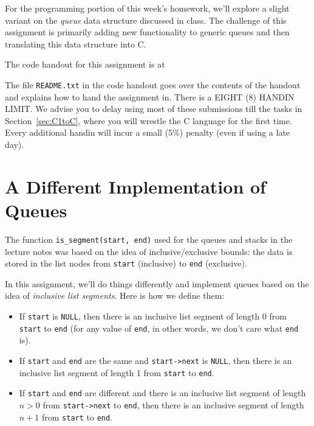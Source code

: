 \documentclass[12pt]{exam}
\begin{document}
\hwTitle

\noindent
For the programming portion of this week's homework, we'll explore a
slight variant on the \emph{queue} data structure discussed in
class. The challenge of this assignment is primarily adding new functionality
to generic queues and then translating this data structure into C.

\bigskip
\noindent
The code handout for this assignment is at
\begin{center}
\end{center}
The file \lstinline'README.txt' in the code handout goes over the
contents of the handout and explains how to hand the assignment in.
There is a EIGHT (8) HANDIN LIMIT.  We advise you to delay using most
of these submissions till the tasks in Section~\ref{sec:C1toC}, where
you will wrestle the C language for the first time.  Every additional
handin will incur a small (5\%) penalty (even if using a late day).


\section{A Different Implementation of Queues}

The function \lstinline'is_segment(start, end)' used for the queues
and stacks in the lecture notes was based on the idea of
inclusive/exclusive bounds: the data is stored in the list nodes from
\lstinline'start' (inclusive) to \lstinline'end' (exclusive).

In this assignment, we'll do things differently and implement queues
based on the idea of \emph{inclusive list segments}. Here is how we
define them:
\begin{itemize}
\item%
  If \lstinline'start' is \lstinline'NULL', then there is an inclusive
  list segment of length 0 from \lstinline'start' to \lstinline'end'
  (for any value of \lstinline'end', in other words, we don't care
  what \lstinline'end' is).
\item%
  If \lstinline'start' and \lstinline'end' are the same and
  \lstinline'start->next' is \lstinline'NULL', then there is an
  inclusive list segment of length 1 from \lstinline'start' to
  \lstinline'end'.
\item%
  If \lstinline'start' and \lstinline'end' are different and there is
  an inclusive list segment of length $n>0$ from
  \lstinline'start->next' to \lstinline'end', then there is an
  inclusive segment of length $n+1$ from \lstinline'start' to
  \lstinline'end'.
\end{itemize}
\end{document}
